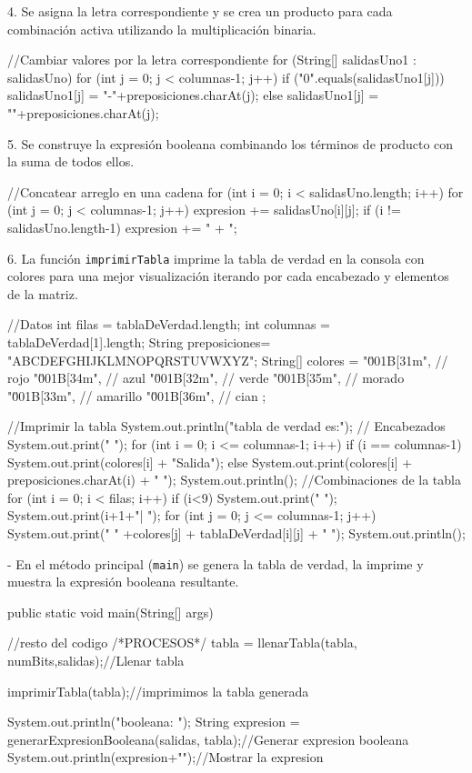 4. Se asigna la letra correspondiente y se crea un producto para cada combinación activa utilizando la multiplicación binaria.
\begin{javaCode}
//Cambiar valores por la letra correspondiente
    for (String[] salidasUno1 : salidasUno) {
        for (int j = 0; j < columnas-1; j++) {
            if ("0".equals(salidasUno1[j])) {
                salidasUno1[j] = "-"+preposiciones.charAt(j);
            } else {
                salidasUno1[j] = ""+preposiciones.charAt(j);
            }
        }
    }
\end{javaCode}

5. Se construye la expresión booleana combinando los términos de producto con la suma de todos ellos.
\begin{javaCode}
//Concatear arreglo en una cadena
for (int i = 0; i < salidasUno.length; i++) {
    for (int j = 0; j < columnas-1; j++) {
        expresion += salidasUno[i][j];
    }
    if (i != salidasUno.length-1) {
        expresion += " + ";
    }
}
\end{javaCode}
6. La función \texttt{imprimirTabla} imprime la tabla de verdad en la consola con colores para una mejor visualización iterando por cada  encabezado y elementos de la matriz.
\begin{javaCode}
//Datos
    int filas = tablaDeVerdad.length;
    int columnas = tablaDeVerdad[1].length;
    String preposiciones= "ABCDEFGHIJKLMNOPQRSTUVWXYZ";
    String[] colores = {
        "\u001B[31m", // rojo
        "\u001B[34m", // azul
        "\u001B[32m", // verde
        "\u001B[35m", // morado
        "\u001B[33m", // amarillo
        "\u001B[36m", // cian
    };
    
    //Imprimir la tabla
    System.out.println("\nLa tabla de verdad es:");
    // Encabezados
    System.out.print("     ");
    for (int i = 0; i <= columnas-1; i++) {
        if (i == columnas-1) {
            System.out.print(colores[i] + "Salida");
        }else{
            System.out.print(colores[i] + preposiciones.charAt(i) + "  ");
        }
    }
    System.out.println();
    //Combinaciones de la tabla
    for (int i = 0; i < filas; i++) {
        if (i<9) {
            System.out.print(" ");
        }
        System.out.print(i+1+"| ");
        for (int j = 0; j <= columnas-1; j++) {
            System.out.print(" " +colores[j] + tablaDeVerdad[i][j] + " ");
        }
        System.out.println();
    }
\end{javaCode}


- En el método principal (\texttt{main}) se genera la tabla de verdad, la imprime y muestra la expresión booleana resultante.
\begin{javaCode}
public static void main(String[] args) {
    //resto del codigo
    /*PROCESOS*/
    tabla = llenarTabla(tabla, numBits,salidas);//Llenar tabla
    
    imprimirTabla(tabla);//imprimimos la tabla generada
    
    System.out.println("\nExpresion booleana: ");
    String expresion = generarExpresionBooleana(salidas, tabla);//Generar expresion booleana
    System.out.println(expresion+"\n");//Mostrar la expresion
}
\end{javaCode}

